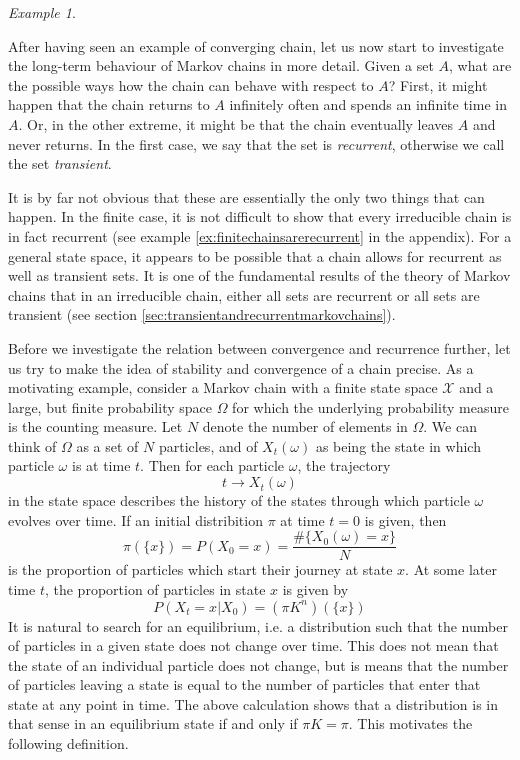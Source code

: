\documentclass[a4paper, draft]{article}
\theoremstyle{own}
\theoremstyle{remark}
\newtheorem{example}{Example}[section]
\begin{document}
\begin{example}
\end{example}

After having seen an example of converging chain, let us now start to investigate the long-term behaviour of Markov chains in more detail. Given a set $A$, what are the possible ways how the chain can behave with respect to $A$? First, it might happen that the chain returns to $A$ infinitely often and spends an infinite time in $A$. Or, in the other extreme, it might be that the chain eventually leaves $A$ and never returns. In the first case, we say that the set is 
{\em recurrent}, otherwise we call the set {\em transient}. 

It is by far not obvious that these are essentially the only two things that can happen. In the finite case, it is not difficult to show that every irreducible chain is in fact recurrent (see example \ref{ex:finitechainsarerecurrent} in the appendix). For a general state space, it appears to be possible that a chain allows for recurrent as well as transient sets. It is one of the fundamental results of the theory of Markov chains that in an irreducible chain, either all sets are recurrent or all sets are transient (see section \ref{sec:transientandrecurrentmarkovchains}). 


Before we investigate the relation between convergence and recurrence further, let us try to make the idea of stability and convergence of a chain precise. As a motivating example, consider a Markov chain with a finite state space ${\mathcal X}$ and a large, but finite probability space $\Omega$ for which the underlying probability measure is the counting measure. Let $N$ denote the number of elements in $\Omega$. We can think of $\Omega$ as a set of $N$ particles, and of $X_t(\omega)$ as being the state in which particle $\omega$ is at time $t$. Then for each particle $\omega$, the trajectory
$$
t \rightarrow X_t(\omega)
$$
in the state space describes the history of the states through which particle $\omega$ evolves over time. If an initial distribition $\pi$ at time $t = 0$ is given, then
$$
\pi(\{ x \}) = P(X_0 = x) = \frac{ \# \{ X_0(\omega) = x \} } {N}
$$
is the proportion of particles which start their journey at state $x$. At some later time $t$, the proportion of particles in state $x$ is given by
$$
P(X_t = x | X_0 ) = (\pi K^n )(\{ x \})
$$
It is natural to search for an equilibrium, i.e. a distribution such that the number of particles in a given state does not change over time. This does not mean that the state of an individual particle does not change, but is means that the number of particles leaving a state is equal to the number of particles that enter that state at any point in time. The above calculation shows that a distribution is in that sense in an equilibrium state if and only if
$\pi K = \pi$. 
This motivates the following definition. 
\end{document}
